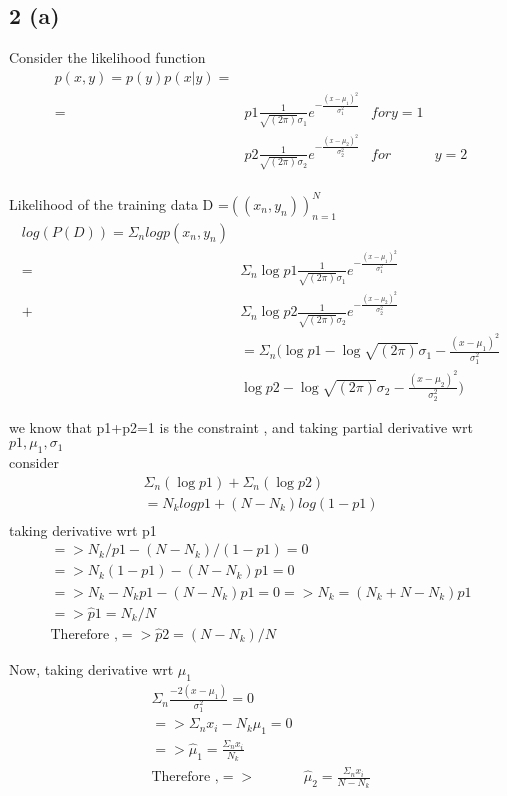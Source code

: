 \documentclass[10pt,letterpaper]{article}
\begin{document}
\subsection{2 (a)}
Consider the likelihood function 
\begin{align*}
p(x,y)=p(y)p(x|y)=\\
=& p1\frac{1}{\sqrt{ (2\pi)}\sigma_1} e^{-\frac{(x-\mu_1)^2}{\sigma_1^2}} &for y=1 \\
& p2\frac{1}{\sqrt{ (2\pi)}\sigma_2} e^{-\frac{(x-\mu_2)^2}{\sigma_2^2}}  &for &y=2\\
\end{align*}

Likelihood of the training data D =$((x_n,y_n))_{n=1}^N$
\begin{align*}
log(P(D)) =\Sigma_n log p(x_n,y_n)\\
=&\Sigma_n \log p1\frac{1}{\sqrt{ (2\pi)}\sigma_1} e^{-\frac{(x-\mu_1)^2}{\sigma_1^2}} \\
+ &\Sigma_n \log p2\frac{1}{\sqrt{ (2\pi)}\sigma_2} e^{-\frac{(x-\mu_2)^2}{\sigma_2^2}} \\
&= \Sigma_n (\log p1 - \log\sqrt{ (2\pi)}\sigma_1 -\frac{(x-\mu_1)^2}{\sigma_1^2} \\
& \log p2 - \log\sqrt{ (2\pi)}\sigma_2 -\frac{(x-\mu_2)^2}{\sigma_2^2} )
\end{align*}

we know that p1+p2=1 is the constraint , and taking partial derivative wrt $p1, \mu_1 , \sigma_1    $\\
consider 
\begin{align*}
\Sigma_n (\log p1 ) +\Sigma_n (\log p2 )\\
= N_k log p1 + (N-N_k) log (1-p1)\\
\end{align*}
taking derivative wrt p1
\begin{align*}
= >N_k /p1 - (N-N_k) / (1-p1)  =0 \\
=>N_k(1-p1) - (N-N_k)p1 =0\\
=>N_k -N_k p1 - (N- N_k)p1 =0 => N_k = (N_k+ N -N_k) p1\\
=> \hat p1= N_k/N\\
\text{Therefore ,} => \hat p2= (N- N_k)/N
\end{align*}


Now, taking derivative wrt $\mu_1$
\begin{align*}
 \Sigma_n \frac{-2(x-\mu_1)}{\sigma_1^2} =0\\
=> \Sigma_n x_i  - N_k \mu_1=0\\
=>\hat \mu_1 =\frac {\Sigma_n x_i}{N_k} \\
\text{Therefore ,} =>& \hat \mu_2=\frac {\Sigma_n x_i} {N-N_k} 
\end{align*}
\end{document}

